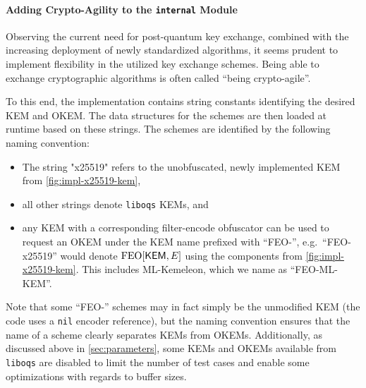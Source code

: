 \paragraph{Adding Crypto-Agility to the \texttt{internal} Module}

Observing the current need for post-quantum key exchange, combined with the increasing deployment of newly standardized algorithms, it seems prudent to implement flexibility in the utilized key exchange schemes. Being able to exchange cryptographic algorithms is often called ``being crypto-agile''.

To this end, the \drivel{} implementation contains string constants identifying the desired KEM and OKEM. The data structures for the schemes are then loaded at runtime based on these strings.
The schemes are identified by the following naming convention:
\begin{itemize}
    \item The string "x25519" refers to the unobfuscated, newly implemented KEM from \cref{fig:impl-x25519-kem},
    \item all other strings denote \texttt{liboqs} KEMs, and
    \item any KEM with a corresponding filter-encode obfuscator can be used to request an OKEM under the KEM name prefixed with ``FEO-'', e.g.~``FEO-x25519'' would denote $\textsf{\textnormal{FEO}}[\mathsf{KEM}, E]$ using the components from \cref{fig:impl-x25519-kem}. This includes ML-Kemeleon, which we name as ``FEO-ML-KEM''.
\end{itemize}

Note that some ``FEO-'' schemes may in fact simply be the unmodified KEM (the code uses a \texttt{nil} encoder reference), but the naming convention ensures that the name of a scheme clearly separates KEMs from OKEMs. Additionally, as discussed above in \cref{sec:parameters}, some KEMs and OKEMs available from \texttt{liboqs} are disabled to limit the number of test cases and enable some optimizations with regards to buffer sizes.

